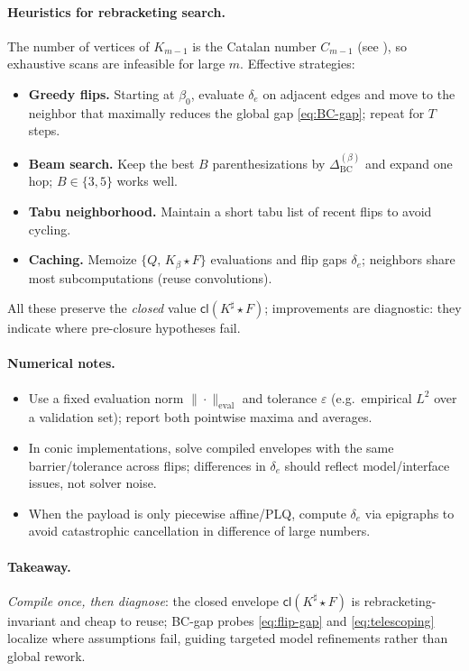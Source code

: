 \documentclass[11pt]{article}
\numberwithin{equation}{section}
\theoremstyle{upright}
\begin{document}
\paragraph{Heuristics for rebracketing search.}
The number of vertices of $K_{m-1}$ is the Catalan number $C_{m-1}$ (see \citealp[Ch.~6]{StanleyEC2}), so exhaustive scans are
infeasible for large $m$. Effective strategies:
\begin{itemize}[leftmargin=*, itemsep=.35ex]
\item \textbf{Greedy flips.} Starting at $\beta_0$, evaluate $\delta_e$ on adjacent edges and move
to the neighbor that maximally reduces the global gap \eqref{eq:BC-gap}; repeat for $T$ steps.
\item \textbf{Beam search.} Keep the best $B$ parenthesizations by $\Delta_{\mathrm{BC}}^{(\beta)}$
and expand one hop; $B\in\{3,5\}$ works well.
\item \textbf{Tabu neighborhood.} Maintain a short tabu list of recent flips to avoid cycling.
\item \textbf{Caching.} Memoize $\{Q,\,K_\beta\star F\}$ evaluations and flip gaps $\delta_e$;
neighbors share most subcomputations (reuse convolutions).
\end{itemize}
All these preserve the \emph{closed} value $\mathsf{cl}(K^\sharp\star F)$; improvements are diagnostic:
they indicate where pre-closure hypotheses fail.

\paragraph{Numerical notes.}
\begin{itemize}[leftmargin=*, itemsep=.35ex]
\item Use a fixed evaluation norm $\|\cdot\|_{\mathrm{eval}}$ and tolerance $\varepsilon$
(e.g.\ empirical $L^2$ over a validation set); report both pointwise maxima and averages.
\item In conic implementations, solve compiled envelopes with the same barrier/tolerance
across flips; differences in $\delta_e$ should reflect model/interface issues, not solver noise.
\item When the payload is only piecewise affine/PLQ, compute $\delta_e$ via epigraphs to avoid
catastrophic cancellation in difference of large numbers.
\end{itemize}

\paragraph{Takeaway.}
\emph{Compile once, then diagnose}: the closed envelope
$\mathsf{cl}(K^\sharp\star F)$ is rebracketing-invariant and cheap to reuse;
BC-gap probes \eqref{eq:flip-gap} and \eqref{eq:telescoping} localize where
assumptions fail, guiding targeted model refinements rather than global rework.
\end{document}
